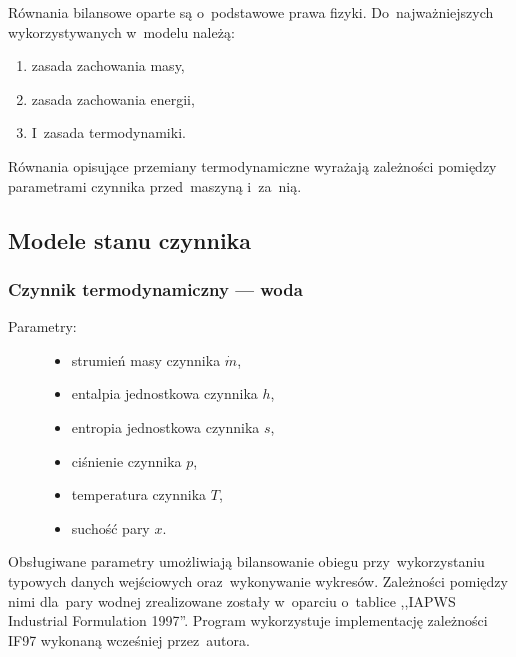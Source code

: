 Równania bilansowe oparte są o~podstawowe prawa fizyki.
Do~najważniejszych wykorzystywanych w~modelu należą:

\begin{enumerate}

	\item zasada zachowania masy,

	\item zasada zachowania energii,

	\item I~zasada termodynamiki.

\end{enumerate}

Równania opisujące przemiany termodynamiczne wyrażają zależności
pomiędzy parametrami czynnika przed~maszyną i~za~nią.

\subsection{Modele stanu czynnika}

\subsubsection{Czynnik termodynamiczny --- woda}

\begin{description}

	\item[Parametry:] \hfill

		\begin{itemize}

			\item strumień masy czynnika $\dot m$,

			\item entalpia jednostkowa czynnika $h$,

			\item entropia jednostkowa czynnika $s$,

			\item ciśnienie czynnika $p$,

			\item temperatura czynnika $T$,

			\item suchość pary $x$.

		\end{itemize}

\end{description}

Obsługiwane parametry umożliwiają bilansowanie obiegu przy~wykorzystaniu
typowych danych wejściowych oraz~wykonywanie wykresów. Zależności
pomiędzy nimi dla~pary wodnej zrealizowane zostały w~oparciu o~tablice
,,IAPWS Industrial Formulation 1997''. Program wykorzystuje
implementację zależności IF97 wykonaną wcześniej przez~autora.

